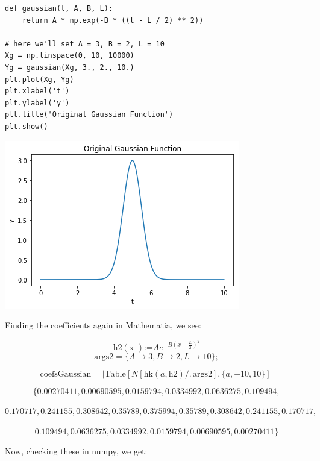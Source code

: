 \documentclass[11pt]{article}
\begin{document}
\begin{verbatim}
def gaussian(t, A, B, L):
    return A * np.exp(-B * ((t - L / 2) ** 2))

# here we'll set A = 3, B = 2, L = 10
Xg = np.linspace(0, 10, 10000)
Yg = gaussian(Xg, 3., 2., 10.)
plt.plot(Xg, Yg)
plt.xlabel('t')
plt.ylabel('y')
plt.title('Original Gaussian Function')
plt.show()
\end{verbatim}

\includegraphics[width=.9\linewidth]{./obipy-resources/333cQA.png}

Finding the coefficients again in Mathematia, we see:

$$\text{h2}(\text{x$\_$})\text{:=}A e^{-B \left(x-\frac{L}{2}\right)^2}$$
$$\text{args2}=\{A\to 3,B\to 2,L\to 10\};$$

$$\text{coefsGaussian}=\left| \text{Table}[N[\text{hk}(a,\text{h2})\text{/.}\,
\text{args2}],\{a,-10,10\}]\right|$$

$$\{0.00270411,0.00690595,0.0159794,0.0334992,0.0636275,0.109494,$$ \\
$$0.170717,0.241155,0.308642,0.35789,0.375994,0.35789,0.308642,0.241155,0.170717,$$ \\
$$0.109494,0.0636275,0.0334992,0.0159794,0.00690595,0.00270411\}$$

Now, checking these in numpy, we get:
\end{document}
